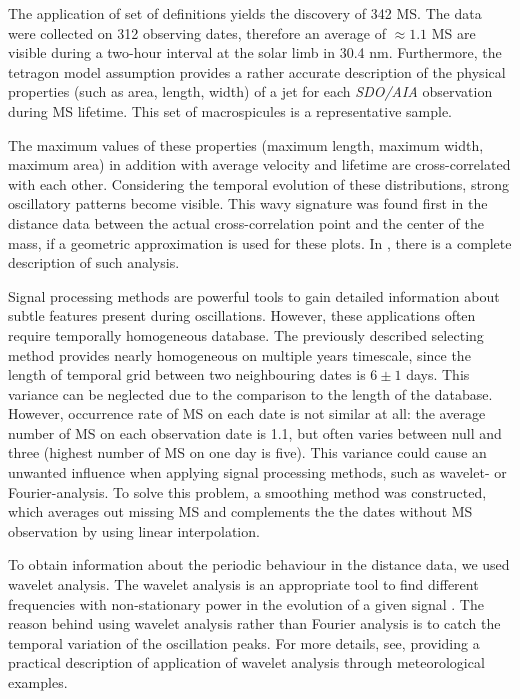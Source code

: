 \documentclass[final,authoryear,5p]{elsarticle}
\begin{document}
The application of set of definitions yields the discovery of 342 MS. The data were collected on 312 observing dates, therefore an average of $\approx 1.1$ MS are visible during a two-hour interval at the solar limb in 30.4 nm. Furthermore, the tetragon model assumption provides a rather accurate description of the physical properties (such as area, length, width) of a jet for each \textit{SDO/AIA} observation during MS lifetime. This set of macrospicules is a representative sample.

The maximum values of these properties (maximum length, maximum width, maximum area) in addition with average velocity and lifetime are cross-correlated with each other. Considering the temporal evolution of these distributions, strong oscillatory patterns become visible. This wavy signature was found first in the distance data between the actual cross-correlation point and the center of the mass, if a geometric approximation is used for these plots. In \cite{kiss2017}, there is a complete description of such analysis. 

Signal processing methods are powerful tools to gain detailed information about subtle features present during oscillations. However, these applications often require temporally homogeneous database. The previously described selecting method provides nearly homogeneous on multiple years timescale, since the length of temporal grid between two neighbouring dates is $6 \pm 1$ days. This variance can be neglected due to the comparison to the length of the database. However, occurrence rate of MS on each date is not similar at all: the average number of MS on each observation date is 1.1, but often varies between null and three (highest number of MS on one day is five). This variance could cause an unwanted influence when applying signal processing methods, such as wavelet- or Fourier-analysis. To solve this problem, a smoothing method was constructed, which averages out missing MS and complements the the dates without MS observation by using linear interpolation.

To obtain information about the periodic behaviour in the distance data, we used wavelet analysis. The wavelet analysis is an appropriate tool to find different frequencies with non-stationary power in the evolution of a given signal \citep{daubechies1990}. The reason behind using wavelet analysis rather than Fourier analysis is to catch the temporal variation of the oscillation peaks. For more details, see, \cite{torrence1998} providing a practical description of application of wavelet analysis through meteorological examples.
\end{document}
